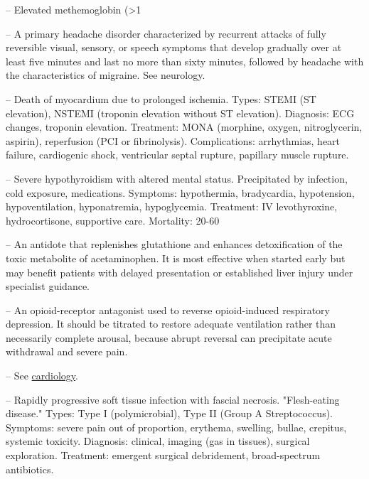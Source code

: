 -- Elevated methemoglobin (>1%

-- A primary headache disorder characterized by recurrent attacks of fully reversible visual, sensory, or speech symptoms that develop gradually over at least five minutes and last no more than sixty minutes, followed by headache with the characteristics of migraine. See neurology.

-- Death of myocardium due to prolonged ischemia. Types: STEMI (ST elevation), NSTEMI (troponin elevation without ST elevation). Diagnosis: ECG changes, troponin elevation. Treatment: MONA (morphine, oxygen, nitroglycerin, aspirin), reperfusion (PCI or fibrinolysis). Complications: arrhythmias, heart failure, cardiogenic shock, ventricular septal rupture, papillary muscle rupture.

-- Severe hypothyroidism with altered mental status. Precipitated by infection, cold exposure, medications. Symptoms: hypothermia, bradycardia, hypotension, hypoventilation, hyponatremia, hypoglycemia. Treatment: IV levothyroxine, hydrocortisone, supportive care. Mortality: 20-60%

-- An antidote that replenishes glutathione and enhances detoxification of the toxic metabolite of acetaminophen. It is most effective when started early but may benefit patients with delayed presentation or established liver injury under specialist guidance.

-- An opioid-receptor antagonist used to reverse opioid-induced respiratory depression. It should be titrated to restore adequate ventilation rather than necessarily complete arousal, because abrupt reversal can precipitate acute withdrawal and severe pain.

-- See \hyperlink{Cardiology}{cardiology}.

-- Rapidly progressive soft tissue infection with fascial necrosis. "Flesh-eating disease." Types: Type I (polymicrobial), Type II (Group A Streptococcus). Symptoms: severe pain out of proportion, erythema, swelling, bullae, crepitus, systemic toxicity. Diagnosis: clinical, imaging (gas in tissues), surgical exploration. Treatment: emergent surgical debridement, broad-spectrum antibiotics.

